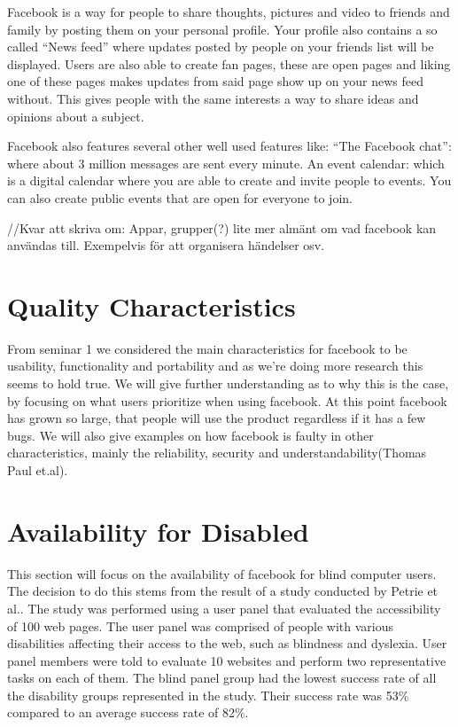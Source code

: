 \documentclass[conference]{IEEEtran}
\begin{document}
Facebook is a way for people to share thoughts, pictures and video to friends
and family by posting them on your personal profile. Your profile also contains
a so called “News feed” where updates posted by people on your friends list
will be displayed. Users are also able to create fan pages, these are open
pages and liking one of these pages makes updates from said page show up on
your news feed without. This gives people with the same interests a way to
share ideas and opinions about a subject.


Facebook also features several other well used features like:
“The Facebook chat”: where about  3 million messages are sent every minute.
An event calendar: which is a digital calendar where you are able to create and
invite people to events. You can also create public events that are open for
everyone to join.

//Kvar att skriva om: Appar, grupper(?) lite mer almänt om vad facebook kan
användas till. Exempelvis för att organisera händelser osv.  


\section{Quality Characteristics}
\label{quality}
From seminar 1 we considered the main characteristics for facebook to be
usability, functionality and portability and as we’re doing more research this
seems to hold true. We will give further understanding as to why this is the
case, by focusing on what users prioritize when using facebook. At this point
facebook has grown so large, that people will use the product regardless if it
has a few bugs. We will also give examples on how facebook is faulty in other
characteristics, mainly the reliability, security and understandability(Thomas
Paul et.al).


\section{Availability for Disabled}
\label{availability}


This section will focus on the availability of facebook for blind computer
users. The decision to do this stems from the result of a study conducted by
Petrie et al.\cite{petrie2004}. The study was performed using a user panel that
evaluated the accessibility of 100 web pages.  The user panel was comprised of
people with various disabilities affecting their access to the web, such as
blindness and dyslexia. User panel members were told to evaluate 10 websites
and perform two representative tasks on each of them. The blind panel group had
the lowest success rate of all the disability groups represented in the study.
Their success rate was 53\% compared to an average success rate of 82\%. 
\end{document}
